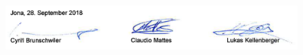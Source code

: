 \begin{figure}[H]
    \centering
    \includegraphics[width=1\linewidth]{assets/task-definition/task_signs.png}
\end{figure}


\renewcommand\section{\clearpage\stdsection}



